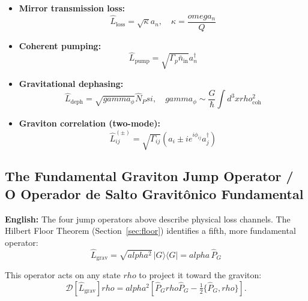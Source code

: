 \documentclass[12pt,a4paper]{article}
\def\Psi{Psi}%
\def\alpha{alpha}%
\def\gamma{gamma}%
\def\rho{rho}%
\def\omega{omega}%
\begin{document}
\begin{itemize}
    \item \textbf{Mirror transmission loss:}
    \begin{equation}
    \hat{L}_{\text{loss}} = \sqrt{\kappa}a_n, \quad \kappa = \frac{\omega_n}{Q}
    \end{equation}
    
    \item \textbf{Coherent pumping:}
    \begin{equation}
    \hat{L}_{\text{pump}} = \sqrt{\Gamma_p \bar{n}_{\text{in}}}a_n^\dagger
    \end{equation}
    
    \item \textbf{Gravitational dephasing:}
    \begin{equation}
    \hat{L}_{\text{deph}} = \sqrt{\gamma_\phi}\hat{N}_\Psi, \quad \gamma_\phi \sim \frac{G}{\hbar}\int d^3x \rho_{\text{coh}}^2
    \end{equation}
    
    \item \textbf{Graviton correlation (two-mode):}
    \begin{equation}
    \hat{L}_{ij}^{(\pm)} = \sqrt{\Gamma_{ij}}\left(a_i \pm ie^{i\phi_{ij}}a_j^\dagger\right)
    \end{equation}
\end{itemize}

\subsection{The Fundamental Graviton Jump Operator / O Operador de Salto Gravitônico Fundamental}

\textbf{English:} The four jump operators above describe physical loss channels. The Hilbert Floor Theorem (Section~\ref{sec:floor}) identifies a fifth, more fundamental operator:
\begin{equation}
\boxed{\hat{L}_{\mathrm{grav}} = \sqrt{\alpha^2}\,|G\rangle\langle G| = \alpha\,\hat{P}_G}
\end{equation}

This operator acts on any state $\rho$ to project it toward the graviton:
\begin{equation}
\mathcal{D}[\hat{L}_{\mathrm{grav}}]\rho = \alpha^2\!\left[\hat{P}_G\rho\hat{P}_G - \tfrac{1}{2}\{\hat{P}_G,\rho\}\right].
\end{equation}
\end{document}
